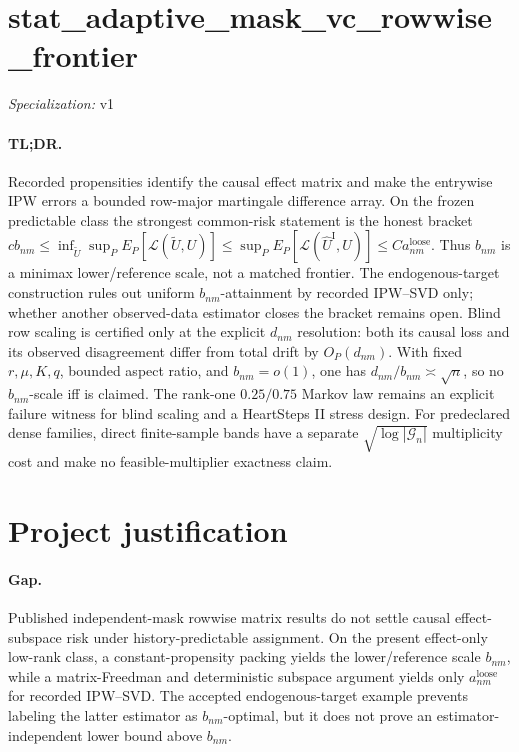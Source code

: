 \documentclass{article}
\begin{document}
\sloppy

\section*{stat\_\allowbreak{}adaptive\_\allowbreak{}mask\_\allowbreak{}vc\_\allowbreak{}rowwise\_\allowbreak{}frontier}

\noindent\textit{Specialization:} v1\par

\paragraph{TL;DR.} Recorded propensities identify the causal effect matrix and make the entrywise IPW errors a bounded row-major martingale difference array.  On the frozen predictable class the strongest common-risk statement is the honest bracket \(c b_{nm}\le\inf_{\widetilde U}\sup_P E_P[\mathcal L(\widetilde U,U)]\le\sup_P E_P[\mathcal L(\widehat U^{\mathrm I},U)]\le C a^{\mathrm{loose}}_{nm}\).  Thus \(b_{nm}\) is a minimax lower/reference scale, not a matched frontier.  The endogenous-target construction rules out uniform \(b_{nm}\)-attainment by recorded IPW--SVD only; whether another observed-data estimator closes the bracket remains open.  Blind row scaling is certified only at the explicit \(d_{nm}\) resolution: both its causal loss and its observed disagreement differ from total drift by \(O_P(d_{nm})\).  With fixed \(r,\mu,K,q\), bounded aspect ratio, and \(b_{nm}=o(1)\), one has \(d_{nm}/b_{nm}\asymp\sqrt n\), so no \(b_{nm}\)-scale iff is claimed.  The rank-one \(0.25/0.75\) Markov law remains an explicit failure witness for blind scaling and a HeartSteps II stress design.  For predeclared dense families, direct finite-sample bands have a separate \(\sqrt{\log|\mathcal G_n|}\) multiplicity cost and make no feasible-multiplier exactness claim.

\section{Project justification}

\paragraph{Gap.} Published independent-mask rowwise matrix results do not settle causal effect-subspace risk under history-predictable assignment.  On the present effect-only low-rank class, a constant-propensity packing yields the lower/reference scale \(b_{nm}\), while a matrix-Freedman and deterministic subspace argument yields only \(a^{\mathrm{loose}}_{nm}\) for recorded IPW--SVD.  The accepted endogenous-target example prevents labeling the latter estimator as \(b_{nm}\)-optimal, but it does not prove an estimator-independent lower bound above \(b_{nm}\).
\end{document}
